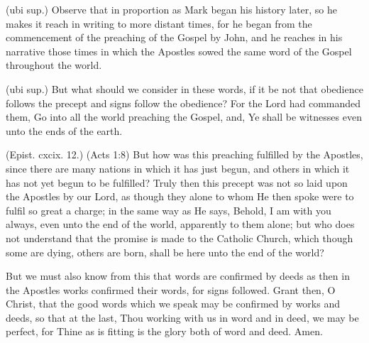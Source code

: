  (ubi sup.) Observe that in proportion as Mark began his history later, so he makes it reach in writing to more distant times, for he began from the commencement of the preaching of the Gospel by John, and he reaches in his narrative those times in which the Apostles sowed the same word of the Gospel throughout the world.

 (ubi sup.) But what should we consider in these words, if it be not that obedience follows the precept and signs follow the obedience? For the Lord had commanded them, Go into all the world preaching the Gospel, and, Ye shall be witnesses even unto the ends of the earth.

 (Epist. cxcix. 12.) (Acts 1:8) But how was this preaching fulfilled by the Apostles, since there are many nations in which it has just begun, and others in which it has not yet begun to be fulfilled? Truly then this precept was not so laid upon the Apostles by our Lord, as though they alone to whom He then spoke were to fulfil so great a charge; in the same way as He says, Behold, I am with you always, even unto the end of the world, apparently to them alone; but who does not understand that the promise is made to the Catholic Church, which though some are dying, others are born, shall be here unto the end of the world?

 But we must also know from this that words are confirmed by deeds as then in the Apostles works confirmed their words, for signs followed. Grant then, O Christ, that the good words which we speak may be confirmed by works and deeds, so that at the last, Thou working with us in word and in deed, we may be perfect, for Thine as is fitting is the glory both of word and deed. Amen.
